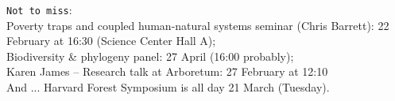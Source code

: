 \documentclass[11pt]{article}
\begin{document}
\vspace{6pt}
\verb|Not to miss|:\\
Poverty traps and coupled human-natural systems seminar (Chris Barrett): 22 February at 16:30 (Science Center Hall A); \\
Biodiversity \& phylogeny panel: 27 April (16:00 probably); \\
Karen James -- Research talk at Arboretum: 27 February at 12:10\\
And ... Harvard Forest Symposium is all day 21 March (Tuesday). 

\vspace{2ex}
\end{document}
